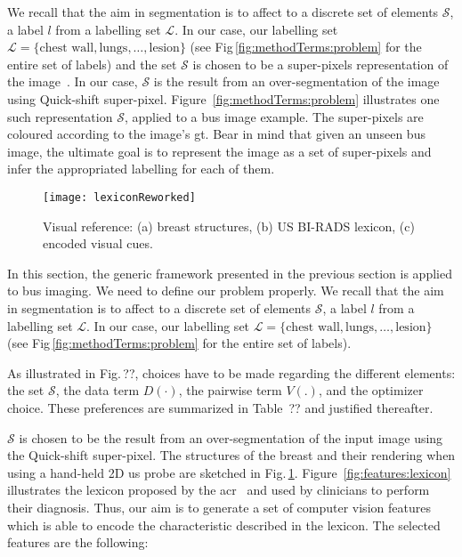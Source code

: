  We recall that the aim in segmentation is to affect to a discrete set of elements $\mathcal{S}$, a label $l$ from a labelling set $\mathcal{L}$. In our case, our labelling set $\mathcal{L} = \{ \text{chest wall}, \text{lungs}, \dots, \text{lesion} \}$ (see Fig\,\ref{fig:methodTerms:problem} for the entire set of labels) and the set $\mathcal{S}$ is chosen to be a super-pixels representation of the image~\cite{achanta2012slic}. In our case, $\mathcal{S}$ is the result from an over-segmentation of the image using Quick-shift super-pixel. Figure~\ref{fig:methodTerms:problem} illustrates one such representation $\mathcal{S}$, applied to a \ac{bus} image example. The super-pixels are coloured according to the image's \ac{gt}. Bear in mind that given an unseen \ac{bus} image, the ultimate goal is to represent the image as a set of super-pixels and infer the appropriated labelling for each of them.

\begin{figure}
  \texttt{[image: lexiconReworked]}
    \caption {{\footnotesize Visual reference: (a) breast structures, (b) US BI-RADS lexicon, (c) encoded visual cues.}} 
    \label{fig:features}
\end{figure}

In this section, the generic framework presented in the previous section is applied to \ac{bus} imaging. We need to define our problem properly. We recall that the aim in segmentation is to affect to a discrete set of elements $\mathcal{S}$, a label $l$ from a labelling set $\mathcal{L}$. In our case, our labelling set $\mathcal{L} = \{ \text{chest wall}, \text{lungs}, \dots, \text{lesion} \}$ (see Fig\,\ref{fig:methodTerms:problem} for the entire set of labels).

As illustrated in Fig.\,{\color{red}??}, choices have to be made regarding the different elements: the set $\mathcal{S}$, the data term $D(\cdot)$, the pairwise term $V(.)$, and the optimizer choice. These preferences are summarized in Table~{\color{red}??} and justified thereafter.

$\mathcal{S}$ is chosen to be the result from an over-segmentation of the input image using the Quick-shift super-pixel. The structures of the breast and their rendering when using a hand-held 2D \ac{us} probe are sketched in Fig.\,\ref{fig:features}. Figure~\ref{fig:features:lexicon} illustrates the lexicon proposed by the \ac{acr}~\cite{biradsus} and used by clinicians to perform their diagnosis. Thus, our aim is to generate a set of computer vision features which is able to encode the characteristic described in the lexicon. The selected features are the following:

